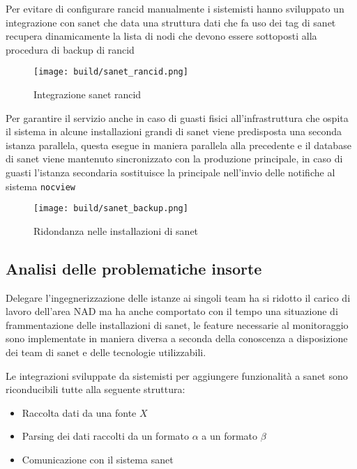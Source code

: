 Per evitare di configurare rancid manualmente i sistemisti hanno sviluppato un integrazione con sanet che data una struttura dati che fa uso dei tag di sanet recupera dinamicamente la lista di nodi che devono essere sottoposti alla procedura di backup di rancid

\begin{figure}[H]
    \centering
    \texttt{[image: build/sanet\_rancid.png]}
    \caption{Integrazione sanet rancid}
    \label{fig:enter-label}
\end{figure}

Per garantire il servizio anche in caso di guasti fisici all'infrastruttura che ospita il sistema in alcune installazioni grandi di sanet viene predisposta una seconda istanza parallela, questa esegue in maniera parallela alla precedente e il database di sanet viene mantenuto sincronizzato con la produzione principale, in caso di guasti l'istanza secondaria sostituisce la principale nell'invio delle notifiche al sistema \verb|nocview|

\begin{figure}[H]
    \centering
    \texttt{[image: build/sanet\_backup.png]}
    \caption{Ridondanza nelle installazioni di sanet}
    \label{fig:enter-label}
\end{figure}

\newpage
\subsection{Analisi delle problematiche insorte}

Delegare l'ingegnerizzazione delle istanze ai singoli team ha si ridotto il carico di lavoro dell'area NAD ma ha anche comportato con il tempo una situazione di frammentazione delle installazioni di sanet, le feature necessarie al monitoraggio sono implementate in maniera diversa a seconda della conoscenza a disposizione dei team di sanet e delle tecnologie utilizzabili.

Le integrazioni sviluppate da sistemisti per aggiungere funzionalità a sanet sono riconducibili tutte alla seguente struttura:

\begin{itemize}
  \item{Raccolta dati da una fonte \(X\)}
  \item{Parsing dei dati raccolti da un formato \(\alpha\) a un formato \(\beta\)}
  \item{Comunicazione con il sistema sanet}
\end{itemize}

